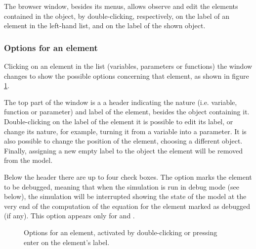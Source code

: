 \documentclass [11pt,a4paper] {book}
\begin{document}
The browser window, besides its menus, allows observe and edit the elements contained in the object, by double-clicking, respectively, on the label of an element in the left-hand list, and on the label of the shown object. 

\subsubsection{Options for an element}\label{subsub:opt_ele}

Clicking on an element in the  list (variables, parameters or functions) the window changes to show the possible options concerning that element, as shown in figure \ref{fig:element_opt}.

The top part of the window is a a header indicating the nature (i.e. variable, function or parameter) and label of the element, besides the object containing it. Double-clicking on the label of the element it is possible to edit its label, or change its nature, for example, turning it from a variable into a parameter. It is also possible to change the position of the element, choosing a different object. Finally, assigning a new empty label to the object the element will be removed from the model.

Below the header there are up to four check boxes. The option  marks the element to be debugged, meaning that when the simulation is run in debug mode (see below), the simulation will be interrupted showing the state of the model at the very end of the computation of the equation for the element marked as debugged (if any). This option appears only for  and .

\begin{figure}[ht]
  \centering
  \caption{Options for an element, activated by double-clicking or pressing enter on the element's label.}
  \label{fig:element_opt}
\end{figure}
\end{document}
